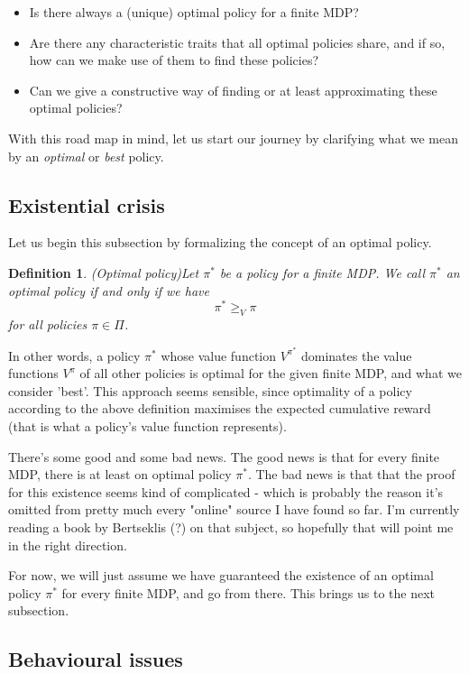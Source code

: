 \documentclass[11pt]{article} %
\newtheorem{defn}{Definition}
\begin{document}
\begin{itemize}
	\item Is there always a (unique) optimal policy for a finite MDP?
	\item Are there any characteristic traits that all optimal policies share, and if so, how can we make use of them to find these policies?
	\item Can we give a constructive way of finding or at least approximating these optimal policies?
\end{itemize}

With this road map in mind, let us start our journey by clarifying what we mean by an \textit{optimal} or \textit{best} policy.

\subsection{Existential crisis}

Let us begin this subsection by formalizing the concept of an optimal policy.

\begin{defn}{(Optimal policy)}\label{def_optPol}
	Let $\pi^*$ be a policy for a finite MDP. We call $\pi^*$ an \textit{optimal policy} if and only if we have $$\pi^* \ge_{V} \pi$$ for all policies $\pi \in \Pi$.
\end{defn}

In other words, a policy $\pi^*$ whose value function $V^{\pi^*}$ dominates the value functions $V^{\pi}$ of all other policies is optimal for the given finite MDP, and what we consider 'best'. This approach seems sensible, since optimality of a policy according to the above definition maximises the expected cumulative reward (that is what a policy's value function represents).

There's some good and some bad news. The good news is that for every finite MDP, there is at least on optimal policy $\pi^*$. The bad news is that that the proof for this existence seems kind of complicated - which is probably the reason it's omitted from pretty much every "online" source I have found so far. I'm currently reading a book by Bertseklis (?) on that subject, so hopefully that will point me in the right direction.

For now, we will just assume we have guaranteed the existence of an optimal policy $\pi^*$ for every finite MDP, and go from there. This brings us to the next subsection.

\subsection{Behavioural issues}
\end{document}
